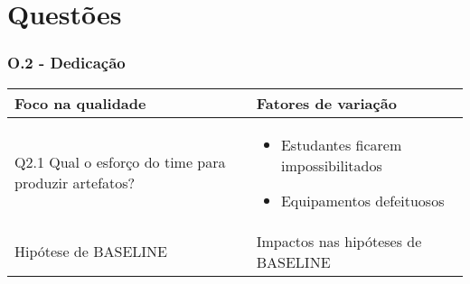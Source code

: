 \chapter{Questões}

\subsection{O.2 - Dedicação}

	\begin{tabular}{ |p{5cm}|p{5cm}|  }
	 \hline
	 Foco na qualidade 		& 		Fatores de variação \\
	 \hline
	 Q2.1 Qual o esforço do time para produzir artefatos? & \begin{itemize} \item Estudantes ficarem impossibilitados \item Equipamentos defeituosos \end{itemize}\\
	 \hline
	 Hipótese de BASELINE 		& 		Impactos nas hipóteses de BASELINE \\
	 \hline
	\end{tabular}